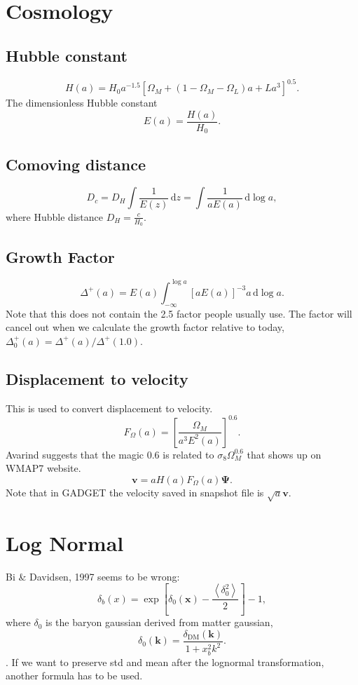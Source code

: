 \documentclass{paper}
\begin{document}
\newcommand{\diff}{\,\mathrm{d}}
\section{Cosmology}
\subsection{Hubble constant}
\[
    H(a) = H_0 a^{-1.5} \left[\Omega_M + 
           (1 - \Omega_M - \Omega_L) a +
       L a^3 \right] ^ {0.5}  .
\] 
The dimensionless Hubble constant
\[
    E(a) = \frac{H(a)}{H_0} .
\]

\subsection{Comoving distance}
\[
    D_c = D_H \int \frac{1}{E(z)} \diff z 
        = \int \frac{1}{a E(a)} \diff \log a,
\]
where Hubble distance $D_H = \frac{c}{H_0}$.
\subsection{Growth Factor}
\[
    \Delta^+(a) = E(a) 
\int_{-\infty}^{\log a} \left[a E(a)\right]^{-3} a \diff \log a .
\]
Note that this does not contain the 2.5 factor people
usually use. The factor will cancel out when we calculate
the growth factor relative to today,
$\Delta^+_0(a) = \Delta^+(a) / \Delta^+(1.0)$.
\subsection{Displacement to velocity}
This is used to convert displacement to velocity. 
\[
    F_\Omega(a) = \left[\frac{\Omega_M}{a^3 E^2(a)}\right]^{0.6} .
\]
Avarind suggests that the magic 0.6 is related to $\sigma_8
\Omega_M ^ 0.6$ that shows up on WMAP7 website.
\[
    \mathbf{v} = a H(a) F_\Omega(a) \mathbf{\Psi} .
\]
Note that in GADGET the velocity saved in snapshot file is 
$\sqrt{a}\mathbf{v}$.

\section{Log Normal}
Bi \& Davidsen, 1997 seems to be wrong:
\[
    \delta_b (x) = \exp\left[
        \delta_0 (\mathbf{x}) 
      - \frac{\left<\delta^2_0\right>}{2}
    \right] - 1,
\]
where $\delta_0$ is the baryon gaussian derived from 
 matter gaussian,
\[
    \delta_0(\mathbf{k}) = \frac{\delta_\mathrm{DM}
    (\mathbf{k})}{1 + x^2_b k^2}.
\].
If we want to preserve std and mean after the lognormal
transformation, another formula has to be used.
\end{document}
